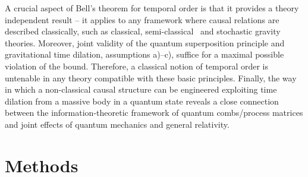 \documentclass[a4paper,11pt]{article}
\begin{document}
A crucial aspect of Bell's theorem for temporal order is that it provides a theory independent result -- it applies to any framework where causal relations are described classically, such as classical, semi-classical~\cite{kiefer2012quantum} and stochastic gravity~\cite{Hu_Verdaguer:2003} theories. 
Moreover, joint validity of the quantum superposition principle and gravitational time dilation, assumptions a)--c),   suffice for a maximal possible violation of the bound. Therefore, a classical notion of temporal order is untenable in any theory compatible with these basic principles. Finally, the way in which a non-classical causal structure can be engineered exploiting time dilation from a massive body in a quantum state reveals a close connection between the information-theoretic framework of quantum combs/process matrices  and joint effects of quantum mechanics and general relativity. 

\section*{Methods}\label{methods}
\end{document}
